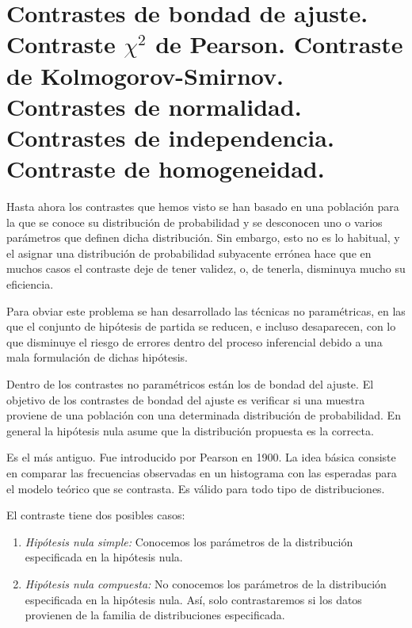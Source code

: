 \chapter[Contrastes de bondad de ajuste.]{Contrastes de bondad de ajuste. \\
\normalsize Contraste $\chi^2$ de Pearson. Contraste de Kolmogorov-Smirnov. Contrastes de normalidad. Contrastes de independencia. Contraste de homogeneidad.}

Hasta ahora los contrastes que hemos visto se han basado en una poblaci\'on para la que se conoce su distribuci\'on de probabilidad y se desconocen uno o varios par\'ametros que definen dicha distribuci\'on. Sin embargo, esto no es lo habitual, y el asignar una distribuci\'on de probabilidad subyacente err\'onea hace que en muchos casos el contraste deje de tener validez, o, de tenerla, disminuya mucho su eficiencia.

Para obviar este problema se han desarrollado las t\'ecnicas no param\'etricas, en las que el conjunto de hip\'otesis de partida se reducen, e incluso desaparecen, con lo que disminuye el riesgo de errores dentro del proceso inferencial debido a una mala formulaci\'on de dichas hip\'otesis.

Dentro de los contrastes no param\'etricos est\'an los de bondad del ajuste. El objetivo de los contrastes de bondad del ajuste es verificar si una muestra proviene de una poblaci\'on con una determinada distribuci\'on de probabilidad. En general la hip\'otesis nula asume que la distribuci\'on propuesta es la correcta. 



Es el m\'as antiguo. Fue introducido por Pearson en 1900. La idea b\'asica consiste en comparar las frecuencias observadas en un histograma con las esperadas para el modelo te\'orico que se contrasta. Es v\'alido para todo tipo de distribuciones.

El contraste tiene dos posibles casos:
\begin{enumerate}
\item \textit{Hip\'otesis nula simple:} Conocemos los par\'ametros de la distribuci\'on especificada en la hip\'otesis nula.
\item \textit{Hip\'otesis nula compuesta:} No conocemos los par\'ametros de la distribuci\'on especificada en la hip\'otesis nula. As\'i, solo contrastaremos si los datos provienen de la familia de distribuciones especificada.
\end{enumerate}

